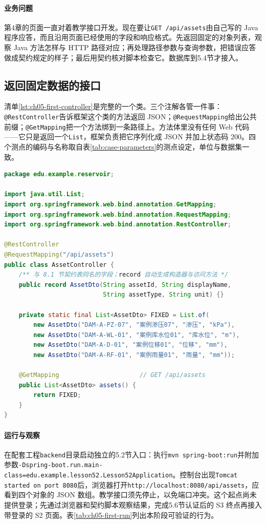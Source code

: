 \paragraph{业务问题}第4章的页面一直对着教学接口开发。现在要让\texttt{GET /api/assets}由自己写的 Java 程序应答，而且沿用页面已经使用的字段和响应格式。先返回固定的对象列表，观察 Java 方法怎样与 HTTP 路径对应；再处理路径参数与查询参数，把错误应答做成契约规定的样子；最后用契约核对脚本检查它。数据库到5.4节才接入。

\subsection{返回固定数据的接口}

清单\ref{lst:ch05-first-controller}是完整的一个类。三个注解各管一件事：\texttt{@RestController}告诉框架这个类的方法返回 JSON；\texttt{@RequestMapping}给出公共前缀；\texttt{@GetMapping}把一个方法绑到一条路径上。方法体里没有任何 Web 代码——它只是返回一个\texttt{List}，框架负责把它序列化成 JSON 并加上状态码 200。四个测点的编码与名称取自表\ref{tab:case-parameters}的测点设定，单位与数据集一致。

\begin{lstlisting}[label={lst:ch05-first-controller},language=Java,caption={AssetController：返回写死的对象列表}]
package edu.example.reservoir;

import java.util.List;
import org.springframework.web.bind.annotation.GetMapping;
import org.springframework.web.bind.annotation.RequestMapping;
import org.springframework.web.bind.annotation.RestController;

@RestController
@RequestMapping("/api/assets")
public class AssetController {
    /** 与 8.1 节契约表同名的字段；record 自动生成构造器与访问方法 */
    public record AssetDto(String assetId, String displayName,
                           String assetType, String unit) {}

    private static final List<AssetDto> FIXED = List.of(
        new AssetDto("DAM-A-PZ-07", "案例渗压07", "渗压", "kPa"),
        new AssetDto("DAM-A-WL-01", "案例库水位01", "库水位", "m"),
        new AssetDto("DAM-A-D-01", "案例位移01", "位移", "mm"),
        new AssetDto("DAM-A-RF-01", "案例雨量01", "雨量", "mm"));

    @GetMapping                      // GET /api/assets
    public List<AssetDto> assets() {
        return FIXED;
    }
}
\end{lstlisting}

\paragraph{运行与观察}在配套工程\texttt{backend}目录启动独立的5.2节入口：执行\texttt{mvn spring-boot:run}并附加参数\texttt{-Dspring-boot.run.main-class=}\allowbreak\texttt{edu.example.lesson52.}\allowbreak\texttt{Lesson52Application}。控制台出现\texttt{Tomcat started on port 8080}后，浏览器打开\texttt{http://localhost:8080/api/assets}，应看到四个对象的 JSON 数组。教学接口须先停止，以免端口冲突。这个起点尚未提供登录；先通过浏览器和契约脚本观察结果，完成5.6节认证后的 S3 终点再接入带登录的 S2 页面。表\ref{tab:ch05-first-run}列出本阶段可验证的行为。

